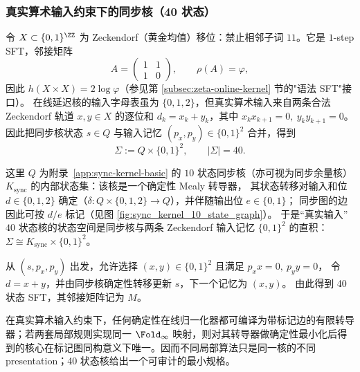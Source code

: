 \subsubsection{真实算术输入约束下的同步核（40 状态）}
令 $X\subset\{0,1\}^{\ZZ}$ 为 Zeckendorf（黄金均值）移位：禁止相邻子词 $11$。它是 $1$-step SFT，邻接矩阵
\[
A=\begin{pmatrix}1&1\\[2pt]1&0\end{pmatrix},\qquad \rho(A)=\varphi,
\]
因此 $h(X\times X)=2\log\varphi$（参见第 \ref{subsec:zeta-online-kernel} 节的"语法 SFT"接口）。
在线延迟核的输入字母表虽为 $\{0,1,2\}$，但真实算术输入来自两条合法 Zeckendorf 轨道
$x,y\in X$ 的逐位和 $d_k=x_k+y_k$，其中 $x_kx_{k+1}=0,\ y_ky_{k+1}=0$。
因此把同步核状态 $s\in Q$ 与输入记忆 $(p_x,p_y)\in\{0,1\}^2$ 合并，得到
\[
\Sigma:=Q\times\{0,1\}^2,\qquad |\Sigma|=40.
\]
\begin{remark}[直积分解与确定性标记]\label{rem:real-input-40-product-kernel}
这里 \(Q\) 为附录~\ref{app:sync-kernel-basic} 的 \(10\) 状态同步核（亦可视为同步余量核）\(K_{\mathrm{sync}}\) 的内部状态集：该核是一个确定性 Mealy 转导器，
其状态转移对输入和位 \(d\in\{0,1,2\}\) 确定（$\delta:Q\times\{0,1,2\}\to Q$），并伴随输出位 \(e\in\{0,1\}\)；
同步图的边因此可按 \(d/e\) 标记（见图 \ref{fig:sync_kernel_10_state_graph}）。
于是“真实输入”\(40\) 状态核的状态空间是同步核与两条 Zeckendorf 输入记忆 \(\{0,1\}^2\) 的直积：
\(\Sigma\cong K_{\mathrm{sync}}\times\{0,1\}^2\)。
\end{remark}
从 $(s,p_x,p_y)$ 出发，允许选择 $(x,y)\in\{0,1\}^2$ 且满足 $p_xx=0,\ p_yy=0$，
令 $d=x+y$，并由同步核确定性转移更新 $s$，下一个记忆为 $(x,y)$。
由此得到 40 状态 SFT，其邻接矩阵记为 $M$。

\begin{remark}[40 状态核的表示唯一性]\label{rem:real-input-40-minimal-kernel}
在真实算术输入约束下，任何确定性在线归一化器都可编译为带标记边的有限转导器；若两套局部规则实现同一 $\Fold_\infty$ 映射，则对其转导器做确定性最小化后得到的核心在标记图同构意义下唯一。因而不同局部算法只是同一核的不同 presentation；40 状态核给出一个可审计的最小规格。
\end{remark}

